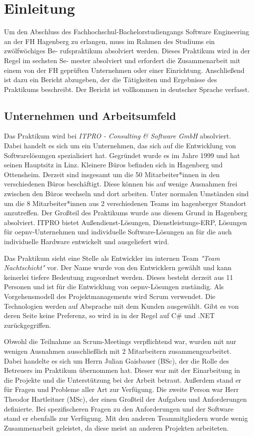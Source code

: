 \chapter{Einleitung}
    Um den Abschluss des Fachhochschul-Bachelorstudiengangs Software Engineering an
    der FH Hagenberg zu erlangen, muss im Rahmen des Studiums ein zwölfwöchiges Be-
    rufspraktikum absolviert werden. Dieses Praktikum wird in der Regel im sechsten Se-
    mester absolviert und erfordert die Zusammenarbeit mit einem von der FH geprüften
    Unternehmen oder einer Einrichtung. Anschließend ist dazu ein Bericht abzugeben, der
    die Tätigkeiten und Ergebnisse des Praktikums beschreibt. Der
    Bericht ist vollkommen in deutscher Sprache verfasst.

\section{Unternehmen und Arbeitsumfeld}

    Das Praktikum wird bei \emph{ITPRO - Consulting \& Software GmbH} \cite{ITPRO} absolviert. Dabei handelt es sich um ein Unternehmen, das sich auf die Entwicklung von Softwarelösungen 
    spezialisiert hat. Gegründet wurde es im Jahre 1999 und hat seinen Hauptsitz in Linz. Kleinere Büros befinden sich in Hagenberg und Ottensheim. Derzeit sind insgesamt um die 
    50 Mitarbeiter*innen in den verschiedenen Büros beschäftigt. Diese können bis auf wenige Ausnahmen frei zwischen den Büros wechseln und dort arbeiten. Unter normalen Umständen sind 
    um die 8 Mitarbeiter*innen  aus 2 verschiedenen Teams im hagenberger Standort anzutreffen.
    Der Großteil des Praktikums wurde aus diesem Grund in Hagenberg absolviert.
    ITPRO bietet Außendienst-Lösungen, Dienstleistungs-ERP, Lösungen für \gls{oepnv}-Unternehmen und individuelle Software-Lösungen an für die auch individuelle Hardware entwickelt
    und ausgeliefert wird.

    Das Praktikum sieht eine Stelle als Entwickler im internen Team \emph{"Team Nachtschicht"} vor. Der Name wurde von den Entwicklern gewählt und kann keinerlei tiefere Bedeutung zugeordnet werden.
    Dieses besteht derzeit aus 11 Personen und ist für die Entwicklung 
    von \gls{oepnv}-Lösungen zuständig. Als Vorgehensmodell des Projektmanagements wird Scrum verwendet. Die Technologien werden auf Absprache mit dem Kunden ausgewählt. Gibt es von deren Seite keine
    Preferenz, so wird in in der Regel auf C\# und .NET zurückgegriffen.

    Obwohl die Teilnahme an Scrum-Meetings verpflichtend war, wurden mit nur wenigen Ausnahmen ausschließlich mit 2 Mitarbeitern zusammengearbeitet. Dabei handelte es sich um Herrn Julian Gaisbauer 
    (BSc), der die Rolle des Betreuers im Praktikum übernommen hat. Dieser war mit der Einarbeitung in die Projekte und die Unterstützung bei der Arbeit betraut. Außerdem stand er für 
    Fragen und Probleme aller Art zur Verfügung. Die zweite Person war Herr Theodor Hartleitner (MSc), der einen Großteil der Aufgaben und Anforderungen definierte. Bei spezifischeren 
    Fragen zu den Anforderungen und der Software stand er ebenfalls zur Verfügung. Mit den anderen Teammitgliedern wurde wenig Zusammenarbeit geleistet, da diese meist an anderen Projekten arbeiteten.


